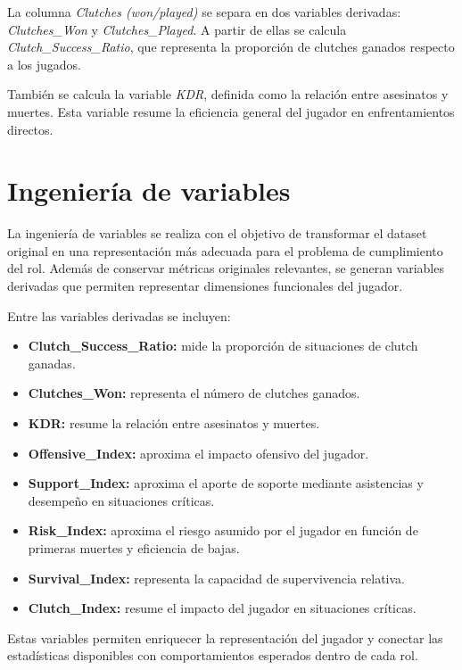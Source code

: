\documentclass{ULBreport} %
\begin{document}
La columna \textit{Clutches (won/played)} se separa en dos variables derivadas: \textit{Clutches\_Won} y \textit{Clutches\_Played}. A partir de ellas se calcula \textit{Clutch\_Success\_Ratio}, que representa la proporción de clutches ganados respecto a los jugados.

También se calcula la variable \textit{KDR}, definida como la relación entre asesinatos y muertes. Esta variable resume la eficiencia general del jugador en enfrentamientos directos.

\section{Ingeniería de variables}

La ingeniería de variables se realiza con el objetivo de transformar el dataset original en una representación más adecuada para el problema de cumplimiento del rol. Además de conservar métricas originales relevantes, se generan variables derivadas que permiten representar dimensiones funcionales del jugador.

Entre las variables derivadas se incluyen:

\begin{itemize}
    \item \textbf{Clutch\_Success\_Ratio:} mide la proporción de situaciones de clutch ganadas.
    \item \textbf{Clutches\_Won:} representa el número de clutches ganados.
    \item \textbf{KDR:} resume la relación entre asesinatos y muertes.
    \item \textbf{Offensive\_Index:} aproxima el impacto ofensivo del jugador.
    \item \textbf{Support\_Index:} aproxima el aporte de soporte mediante asistencias y desempeño en situaciones críticas.
    \item \textbf{Risk\_Index:} aproxima el riesgo asumido por el jugador en función de primeras muertes y eficiencia de bajas.
    \item \textbf{Survival\_Index:} representa la capacidad de supervivencia relativa.
    \item \textbf{Clutch\_Index:} resume el impacto del jugador en situaciones críticas.
\end{itemize}

Estas variables permiten enriquecer la representación del jugador y conectar las estadísticas disponibles con comportamientos esperados dentro de cada rol.
\end{document}
